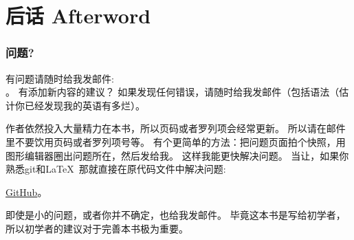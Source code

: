 \documentclass[UTF8,nofonts]{ctexart}
\begin{document}

\part*{后话 Afterword}

\section{问题?}

有问题请随时给我发邮件: \\
\GTT{<\EMAIL>}。
有添加新内容的建议？
如果发现任何错误，请随时给我发邮件（包括语法（估计你已经发现我的英语有多烂）。

作者依然投入大量精力在本书，所以页码或者罗列项会经常更新。
所以请在邮件里不要饮用页码或者罗列项号等。
有个更简单的方法：把问题页面拍个快照，用图形编辑器圈出问题所在，然后发给我。
这样我能更快解决问题。
当让，如果你熟悉git和\LaTeX\, 那就直接在原代码文件中解决问题: 

\href{http://go.yurichev.com/17089}{GitHub}。

即使是小的问题，或者你并不确定，也给我发邮件。
毕竟这本书是写给初学者，所以初学者的建议对于完善本书极为重要。
\end{document}
